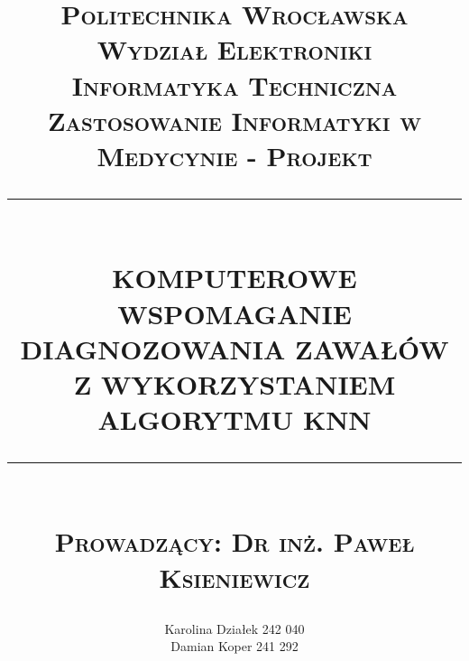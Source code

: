 \documentclass[runningheads]{llncs2e/llncs}
\begin{document}
\renewcommand*{\figurename}{Rysunek}
\renewcommand*{\tablename}{Tabela}
\renewcommand*{\keywordname}{{\bf Słowa kluczowe:}}
\renewcommand*{\abstractname}{{\bf Abstrakt:}}

\newcommand{\HRule}[1]{\rule{\linewidth}{#1}} 	%

\makeatletter							%
\def\printtitle{%
    {\centering \@title\par}}
\makeatother

\makeatletter							%
\def\printauthor{%
    {\centering \large \@author}}
\makeatother

\title{	\normalsize \textsc{Politechnika Wrocławska\\Wydział Elektroniki\\Informatyka Techniczna\\Zastosowanie Informatyki w Medycynie - Projekt} 	%
		 	\\[2.0cm]								%
			\HRule{0.5pt} \\						%
			\LARGE \textbf{\uppercase{Komputerowe wspomaganie diagnozowania zawałów z wykorzystaniem algorytmu kNN}}	%
			\HRule{2pt} \\ [0.5cm]		%
			\normalsize \textsc{Prowadzący: Dr inż. Paweł Ksieniewicz}
		}

\author{
		Karolina Działek 242 040\\
		Damian Koper 241 292\\
}
\end{document}
